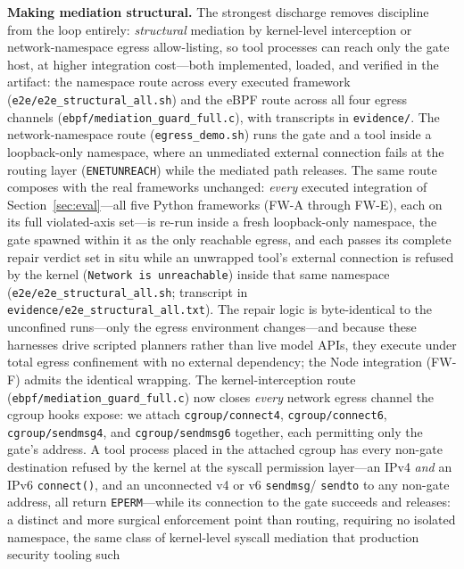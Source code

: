 \documentclass[10pt,journal,compsoc]{IEEEtran}
\begin{document}
\smallskip\noindent\textbf{Making mediation structural.} The strongest
discharge removes discipline from the loop entirely: \emph{structural}
mediation by kernel-level interception or network-namespace egress
allow-listing, so tool processes can reach only the
gate host, at higher integration cost---both implemented, loaded, and
verified in the artifact: the namespace route across every executed framework
(\texttt{e2e/e2e\_structural\_all.sh}) and the eBPF route across all four
egress channels (\texttt{ebpf/mediation\_guard\_full.c}), with transcripts in
\texttt{evidence/}.
The network-namespace route (\texttt{egress\_demo.sh}) runs the gate and a
tool inside a loopback-only namespace, where an unmediated external
connection fails at the routing layer (\texttt{ENETUNREACH}) while the
mediated path releases. The same route composes with the real frameworks unchanged: \emph{every}
executed integration of Section~\ref{sec:eval}---all five Python frameworks
(\textsf{FW-A} through \textsf{FW-E}), each on its full violated-axis set---is
re-run inside a fresh loopback-only namespace, the gate spawned within it as
the only reachable egress, and each passes its complete repair verdict set in
situ while an unwrapped tool's external connection is refused by the kernel
(\texttt{Network is unreachable}) inside that same namespace
(\texttt{e2e/e2e\_structural\_all.sh}; transcript in
\texttt{evidence/e2e\_structural\_all.txt}). The repair logic is byte-identical
to the unconfined runs---only the egress environment changes---and because
these harnesses drive scripted planners rather than live model APIs, they
execute under total egress confinement with no external dependency; the Node
integration (\textsf{FW-F}) admits the identical wrapping. The kernel-interception route
(\texttt{ebpf/mediation\_guard\_full.c}) now closes \emph{every} network
egress channel the cgroup hooks expose: we attach \texttt{cgroup/connect4},
\texttt{cgroup/connect6}, \texttt{cgroup/sendmsg4}, and
\texttt{cgroup/sendmsg6} together, each permitting only the gate's address. A
tool process placed in the attached cgroup has every non-gate destination
refused by the kernel at the syscall permission layer---an IPv4 \emph{and} an
IPv6 \texttt{connect()}, and an unconnected v4 or v6 \texttt{sendmsg}/%
\texttt{sendto} to any non-gate address, all return \texttt{EPERM}---while its
connection to the gate succeeds and releases: a distinct and more surgical
enforcement point than routing, requiring no isolated namespace, the same
class of kernel-level syscall mediation that production security tooling such
\end{document}

